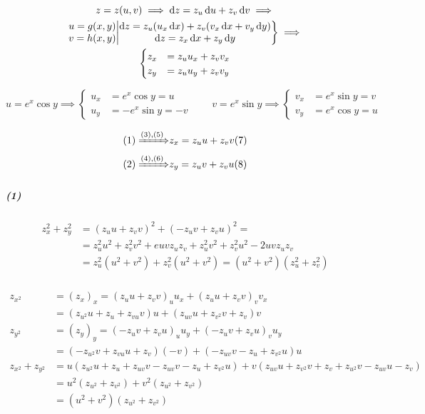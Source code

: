 \documentclass[11pt,a4paper,titlepage,draft]{article}
\begin{document}
\begin{infobox}{}
\begin{gather*}
z=z(u,v) \implies \dif z =z_u \dif u + z_v \dif v \implies \\
\left.
\begin{matrix}
u = g(x,y)\\
v=h(x,y)
\end{matrix}
\middle|
\begin{matrix}
\dif z = z_u(u_x\dif x)+z_v(v_x\dif x + v_y\dif y)\\
\dif z = z_x\dif x + z_y \dif y
\end{matrix}
\right\rbrace \implies \\
\begin{cases}
z_x &= z_uu_x+z_vv_x \\
z_y &= z_uu_y+z_vv_y
\end{cases}
\end{gather*}
\end{infobox}

\[
u=e^x\cos y \implies \begin{cases}
u_x &= e^x\cos y = u\\
u_y &= -e^x\sin y = -v
\end{cases}
\qquad
v=e^x\sin y \implies \begin{cases}
v_x &=e^x\sin y =v\\
v_y &=e^x\cos y = u
\end{cases}
\]

\begin{align*}
(1) \xRightarrow{(3),(5)} & z_x=z_u u + z_v v (7) \\
(2) \xRightarrow{(4),(6)} & z_y=z_u v + z_v u (8) \\
\end{align*}

\subparagraph{(1)}
\begin{align*}
z_x^2 + z_y^2 &= (z_u u + z_v v)^2+(-z_u v + z_v u)^2 =
\\ &=
z_u^2u^2+z_v^2v^2+euvz_uz_v+z_u^2v^2+z_v^2u^2-2uvz_uz_v \\
&=
z_u^2(u^2+v^2)+z_v^2(u^2+v^2) = (u^2+v^2)(z_u^2+z_v^2)
\end{align*}

\subparagraph{}
\begin{align}
z_{x^2} & =(z_x)_x = (z_uu+z_vv)_u u_x+(z_uu+z_vv)_vv_x \nonumber \\
&=
(z_{u^2}u+z_u+z_{vu}v)u+(z_{uv}u+z_{v^2}v+z_v)v\\
z_{y^2} &= (z_y)_y = (-z_uv +z_vu)_uu_y+(-z_uv+z_vu)_vu_y \nonumber \\
&= (-z_{u^2}v+z_{vu}u+z_v)(-v)+(-z_{uv}v-z_u+z_{v^2}u)u \\
z_{x^2}+z_{y^2} &= u(z_{u^2}u+z_u+z_{uv}v-z_{uv}v-z_u+z_{v^2}u)
+ v(z_{uv}u+z_{v^2}v+z_v+z_{u^2}v-z_{uv}u-z_v) \nonumber \\
&= u^2(z_{u^2}+z_{v^2})+v^2(z_{u^2}+z_{v^2}) \nonumber \\
&= (u^2+v^2)(z_{u^2}+z_{v^2})
\end{align}
\end{document}
